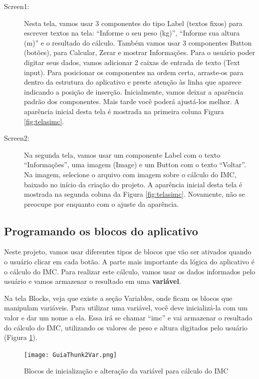 \documentclass[11pt,fleqn]{book} %
\begin{document}
\begin{description}
    \item[Screen1:] Nesta tela, vamos usar 3 componentes do tipo Label (textos fixos) para escrever textos na tela: ``Informe o seu peso (kg)'', ``Informe sua altura (m)'' e o resultado do cálculo. Também vamos usar 3 componentes Button (botões), para Calcular, Zerar e mostrar Informações. Para o usuário poder digitar seus dados, vamos adicionar 2 caixas de entrada de texto (Text input). Para posicionar os componentes na ordem certa, arraste-os para dentro da estrutura do aplicativo e preste atenção às linha que aparece indicando a posição de inserção. Inicialmente, vamos deixar a aparência padrão dos componentes. Mais tarde você poderá ajustá-los melhor. A aparência inicial desta tela é mostrada na primeira coluna Figura \ref{fig:telasimc}.
    
    \item[Screen2:] Na segunda tela, vamos usar um componente Label com o texto ``Informações'', uma imagem (Image) e um Button com o texto ``Voltar''. Na imagem, selecione o arquivo com imagem sobre o cálculo do IMC, baixado no início da criação do projeto. A aparência inicial desta tela é mostrada na segunda coluna da Figura \ref{fig:telasimc}. Novamente, não se preocupe por enquanto com o ajuste da aparência.
    
\end{description}




\subsection{Programando os blocos do aplicativo}

Neste projeto, vamos usar diferentes tipos de blocos que vão ser ativados quando o usuário clicar em cada botão. A parte mais importante da lógica do aplicativo é o cálculo do IMC. Para realizar este cálculo, vamos usar os dados informados pelo usuário e vamos armazenar o resultado em uma \textbf{variável}.

Na tela Blocks, veja que existe a seção Variables, onde ficam os blocos que manipulam variáveis. Para utilizar uma variável, você deve inicializá-la com um valor e dar um nome a ela. Essa irá se chamar ``imc'' e vai armazenar o resultado do cálculo do IMC, utilizando os valores de peso e altura digitados pelo usuário (Figura \ref{fig:imcvar}).

\begin{figure}[H]
	\centering
	\texttt{[image: GuiaThunk2Var.png]}\hspace{0.2cm}
	\caption{Blocos de inicialização e alteração da variável para cálculo do IMC}\label{fig:imcvar}
\end{figure} 
\end{document}
